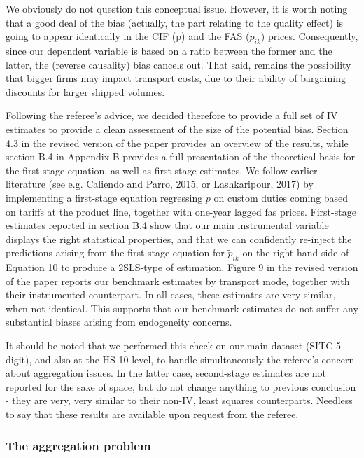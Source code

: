 \documentclass[a4paper,11pt]{article}
\begin{document}
We obviously do not question this conceptual issue. However, it is worth noting that a good deal of the bias (actually, the part relating to the quality effect) is going to appear identically in the CIF (p) and the FAS ($\widetilde{p}_{ik}$) prices. Consequently, since our dependent variable is based on a ratio between the former and the latter, the (reverse causality) bias cancels out. That said, remains the possibility that bigger firms may impact transport costs, due to their ability of bargaining discounts for larger shipped volumes.

Following the referee's advice, we decided therefore to provide a full set of IV estimates to provide a clean assessment of the size of the potential bias. Section 4.3 in the revised version of the paper provides an overview of the results, while section B.4 in Appendix B provides a full presentation of the theoretical basis for the first-stage equation, as well as first-stage estimates. We follow earlier literature (see e.g. Caliendo and Parro, 2015, or Lashkaripour, 2017) by implementing a first-stage equation regressing $\widetilde{p}$ on custom duties coming based on tariffs at the product line, together with one-year lagged fas prices. First-stage estimates reported in section B.4 show that our main instrumental variable displays the right statistical properties, and that we can confidently re-inject the predictions arising from the first-stage equation for $\widetilde{p}_{ik}$ on the right-hand side of Equation 10 to produce a 2SLS-type of estimation. Figure 9 in the revised version of the paper reports our benchmark estimates by transport mode, together with their instrumented counterpart. In all cases, these estimates are very similar, when not identical. This supports that our benchmark estimates do not suffer any substantial biases arising from endogeneity concerns.

It should be noted that we performed this check on our main dataset (SITC 5 digit), and also at the HS 10 level, to handle simultaneously the referee's concern about aggregation issues. In the latter case, second-stage estimates are not reported for the sake of space, but do not change anything to previous conclusion - they are very, very similar to their non-IV, least squares counterparts. Needless to say that these results are available upon request from the referee.


\subsubsection{The aggregation problem}
\end{document}
